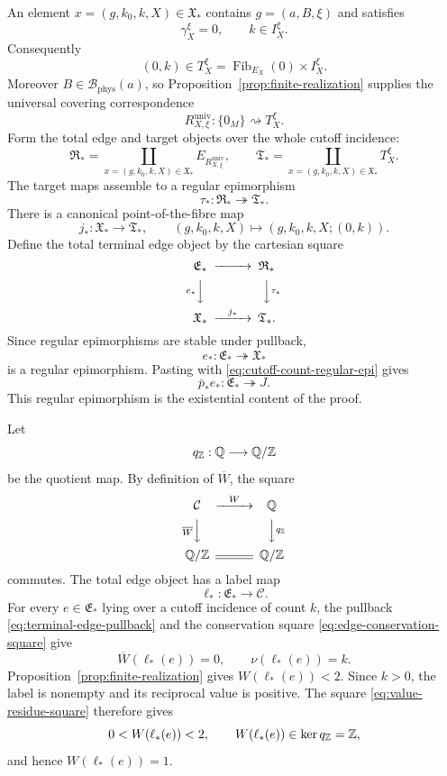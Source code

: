 An element $x=(g,k_0,k,X)\in\mathfrak X_*$ contains $g=(a,B,\xi)$ and satisfies
\[
\gamma_X^\xi=0,
\qquad
k\in I_X^\xi.
\]
Consequently
\[
(0,k)\in
T_X^\xi
=
\operatorname{Fib}_{E_X}(0)\times I_X^\xi.
\]
Moreover $B\in\mathcal B_{\mathrm{phys}}(a)$, so Proposition~\ref{prop:finite-realization} supplies the universal covering correspondence
\[
R_{X,\xi}^{\mathrm{univ}}:\{0_M\}\rightsquigarrow T_X^\xi.
\]
Form the total edge and target objects over the whole cutoff incidence:
\[
\mathfrak R_*
=
\coprod_{x=(g,k_0,k,X)\in\mathfrak X_*}
E_{R_{X,\xi}^{\mathrm{univ}}},
\qquad
\mathfrak T_*
=
\coprod_{x=(g,k_0,k,X)\in\mathfrak X_*}T_X^\xi.
\]
The target maps assemble to a regular epimorphism
\[
\tau_*:\mathfrak R_*\twoheadrightarrow\mathfrak T_*.
\]
There is a canonical point-of-the-fibre map
\[
j_*:\mathfrak X_*\longrightarrow\mathfrak T_*,
\qquad
(g,k_0,k,X)\longmapsto(g,k_0,k,X;(0,k)).
\]
Define the total terminal edge object by the cartesian square
\begin{equation}\label{eq:terminal-edge-pullback}
\begin{CD}
\mathfrak E_* @>>> \mathfrak R_*\\
@V{e_*}VV @VV{\tau_*}V\\
\mathfrak X_* @>{j_*}>> \mathfrak T_*.
\end{CD}
\end{equation}
Since regular epimorphisms are stable under pullback,
\[
e_*:\mathfrak E_*\twoheadrightarrow\mathfrak X_*
\]
is a regular epimorphism.  Pasting with \eqref{eq:cutoff-count-regular-epi} gives
\begin{equation}\label{eq:terminal-witness-regular-epi}
\bar p_*e_*:\mathfrak E_*\twoheadrightarrow J.
\end{equation}
This regular epimorphism is the existential content of the proof.

Let
\[
q_{\mathbb Z}:\mathbb Q\longrightarrow\mathbb Q/\mathbb Z
\]
be the quotient map.  By definition of $\overline W$, the square
\begin{equation}\label{eq:value-residue-square}
\begin{CD}
\mathcal C @>{W}>> \Q\\
@V{\overline W}VV @VV{q_{\Z}}V\\
\Q/\Z @= \Q/\Z
\end{CD}
\end{equation}
commutes.  The total edge object has a label map
\[
\ell_*:\mathfrak E_*\longrightarrow\mathcal C.
\]
For every $e\in\mathfrak E_*$ lying over a cutoff incidence of count $k$, the pullback \eqref{eq:terminal-edge-pullback} and the conservation square \eqref{eq:edge-conservation-square} give
\[
\overline W(\ell_*(e))=0,
\qquad
\nu(\ell_*(e))=k.
\]
Proposition~\ref{prop:finite-realization} gives $W(\ell_*(e))<2$.  Since $k>0$, the label is nonempty and its reciprocal value is positive.  The square \eqref{eq:value-residue-square} therefore gives
\[
0<W(\ell_*(e))<2,
\qquad
W(\ell_*(e))\in\ker q_{\mathbb Z}=\mathbb Z,
\]
and hence $W(\ell_*(e))=1$.

